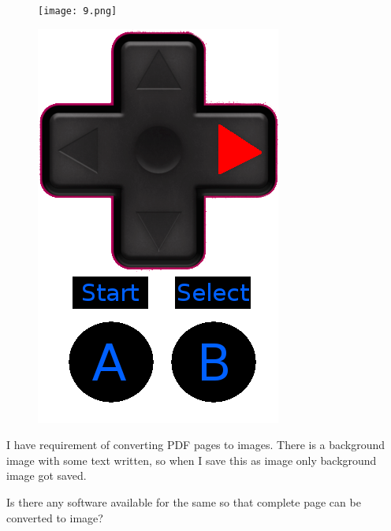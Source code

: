 \documentclass{beamer}
\begin{document}
\beamertemplatenavigationsymbolsempty

\begin{frame}

\begin{figure}
\begin{minipage}{0.6\textwidth}
    \texttt{[image: 9.png]}
\end{minipage}
\begin{minipage}{0.3\textwidth}
    \includegraphics[width=\textwidth]{ControllerImages/PressingRight.png}
\end{minipage}
\end{figure}


I have requirement of converting PDF pages to images. There is a background image with some text written, so when I save this as image only background image got saved.

Is there any software available for the same so that complete page can be converted to image?



\end{frame}
\end{document}
